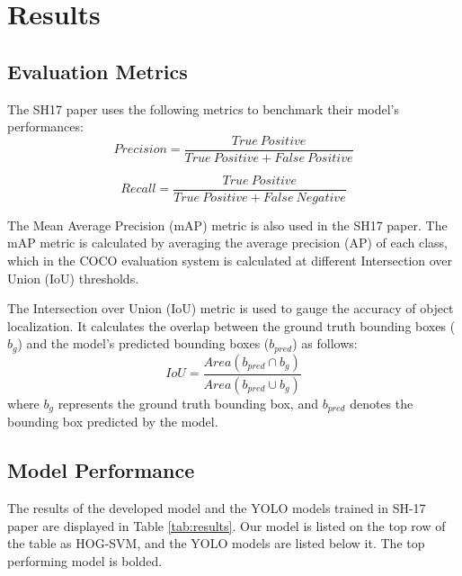 \section{Results}

\subsection{Evaluation Metrics}

The SH17 paper uses the following metrics to benchmark their model's performances:
\begin{equation}
Precision = \frac{True\ Positive}{True\ Positive + False\ Positive}
\end{equation}

\begin{equation}
Recall = \frac{True\ Positive}{True\ Positive + False\ Negative}
\end{equation}

The Mean Average Precision (mAP) metric is also used in the SH17 paper.
The mAP metric is calculated by averaging the average precision (AP) of each class, which in the COCO evaluation system \cite{cocodatasetpage} is calculated at different Intersection over Union (IoU) thresholds.

The Intersection over Union (IoU) metric is used to gauge the accuracy of object localization. 
It calculates the overlap between the ground truth bounding boxes ($b_g$) and the model's predicted bounding boxes ($b_{pred}$) as follows:
\begin{equation}
IoU = \frac{Area(b_{pred} \cap b_g)}{Area(b_{pred} \cup b_g)}
\end{equation}
where $b_g$ represents the ground truth bounding box, and $b_{pred}$ denotes the bounding box predicted by the model.


\subsection{Model Performance}

The results of the developed model and the YOLO models trained in SH-17 paper are displayed in Table \ref{tab:results}.
Our model is listed on the top row of the table as HOG-SVM, and the YOLO models are listed below it.
The top performing model is bolded.

